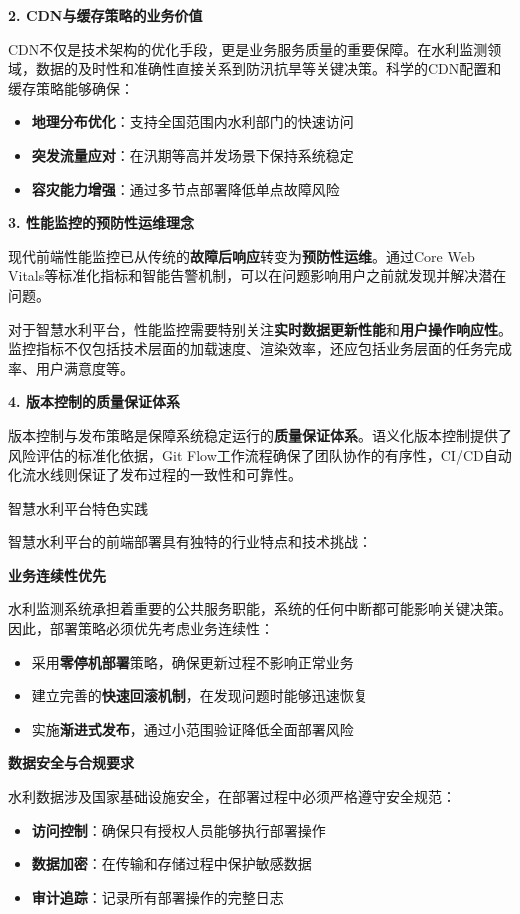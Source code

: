 {{\textbf{2. CDN与缓存策略的业务价值}

CDN不仅是技术架构的优化手段，更是业务服务质量的重要保障。在水利监测领域，数据的及时性和准确性直接关系到防汛抗旱等关键决策。科学的CDN配置和缓存策略能够确保：

\begin{itemize}
\tightlist
\item
  \textbf{地理分布优化}：支持全国范围内水利部门的快速访问
\item
  \textbf{突发流量应对}：在汛期等高并发场景下保持系统稳定
\item
  \textbf{容灾能力增强}：通过多节点部署降低单点故障风险
\end{itemize}

\textbf{3. 性能监控的预防性运维理念}

现代前端性能监控已从传统的\textbf{故障后响应}转变为\textbf{预防性运维}。通过Core Web Vitals等标准化指标和智能告警机制，可以在问题影响用户之前就发现并解决潜在问题。

对于智慧水利平台，性能监控需要特别关注\textbf{实时数据更新性能}和\textbf{用户操作响应性}。监控指标不仅包括技术层面的加载速度、渲染效率，还应包括业务层面的任务完成率、用户满意度等。

\textbf{4. 版本控制的质量保证体系}

版本控制与发布策略是保障系统稳定运行的\textbf{质量保证体系}。语义化版本控制提供了风险评估的标准化依据，Git Flow工作流程确保了团队协作的有序性，CI/CD自动化流水线则保证了发布过程的一致性和可靠性。

 智慧水利平台特色实践

智慧水利平台的前端部署具有独特的行业特点和技术挑战：

\textbf{业务连续性优先}

水利监测系统承担着重要的公共服务职能，系统的任何中断都可能影响关键决策。因此，部署策略必须优先考虑业务连续性：

\begin{itemize}
\tightlist
\item
  采用\textbf{零停机部署}策略，确保更新过程不影响正常业务
\item
  建立完善的\textbf{快速回滚机制}，在发现问题时能够迅速恢复
\item
  实施\textbf{渐进式发布}，通过小范围验证降低全面部署风险
\end{itemize}

\textbf{数据安全与合规要求}

水利数据涉及国家基础设施安全，在部署过程中必须严格遵守安全规范：

\begin{itemize}
\tightlist
\item
  \textbf{访问控制}：确保只有授权人员能够执行部署操作
\item
  \textbf{数据加密}：在传输和存储过程中保护敏感数据
\item
  \textbf{审计追踪}：记录所有部署操作的完整日志
\end{itemize}

}}

